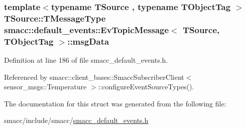 \subsubsection[{\texorpdfstring{msg\+Data}{msgData}}]{\setlength{\rightskip}{0pt plus 5cm}template$<$typename T\+Source , typename T\+Object\+Tag $>$ T\+Source\+::\+T\+Message\+Type {\bf smacc\+::default\+\_\+events\+::\+Ev\+Topic\+Message}$<$ T\+Source, T\+Object\+Tag $>$\+::msg\+Data}\hypertarget{structsmacc_1_1default__events_1_1EvTopicMessage_a82384568b702a0c3a3dc2fbe7eeefea9}{}\label{structsmacc_1_1default__events_1_1EvTopicMessage_a82384568b702a0c3a3dc2fbe7eeefea9}


Definition at line 186 of file smacc\+\_\+default\+\_\+events.\+h.



Referenced by smacc\+::client\+\_\+bases\+::\+Smacc\+Subscriber\+Client$<$ sensor\+\_\+msgs\+::\+Temperature $>$\+::configure\+Event\+Source\+Types().



The documentation for this struct was generated from the following file\+:\begin{DoxyCompactItemize}
\item 
smacc/include/smacc/\hyperlink{smacc__default__events_8h}{smacc\+\_\+default\+\_\+events.\+h}\end{DoxyCompactItemize}
